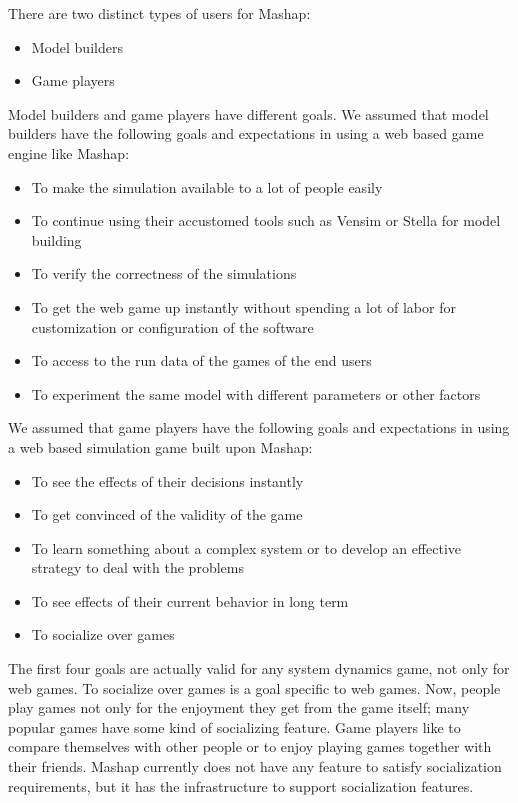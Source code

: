 \documentclass[12pt,a4paper]{paper}
\begin{document}
There are two distinct types of users for Mashap:

\begin{itemize}
	\item Model builders
	\item Game players
\end{itemize}

Model builders and game players have different goals. We assumed that model builders have the following goals and expectations in using a web based game engine like Mashap:

\begin{itemize}
	\item To make the simulation available to a lot of people easily
	\item To continue using their accustomed tools such as Vensim or Stella for model building
	\item To verify the correctness of the simulations
	\item To get the web game up instantly without spending a lot of labor for customization or configuration of the software
	\item To access to the run data of the games of the end users
	\item To experiment the same model with different parameters or other factors
\end{itemize}

We assumed that game players have the following goals and expectations in using a web based simulation game built upon Mashap:

\begin{itemize}
	\item To see the effects of their decisions instantly
	\item To get convinced of the validity of the game
	\item To learn something about a complex system or to develop an effective strategy to deal with the problems
	\item To see effects of their current behavior in long term
	\item To socialize over games
\end{itemize}

The first four goals are actually valid for any system dynamics game, not only for web games. To socialize over games is a goal specific to web games. Now, people play games not only for the enjoyment they get from the game itself; many popular games have some kind of socializing feature. Game players like to compare themselves with other people or to enjoy playing games together with their friends. Mashap currently does not have any feature to satisfy socialization requirements, but it has the infrastructure to support socialization features.
\end{document}
